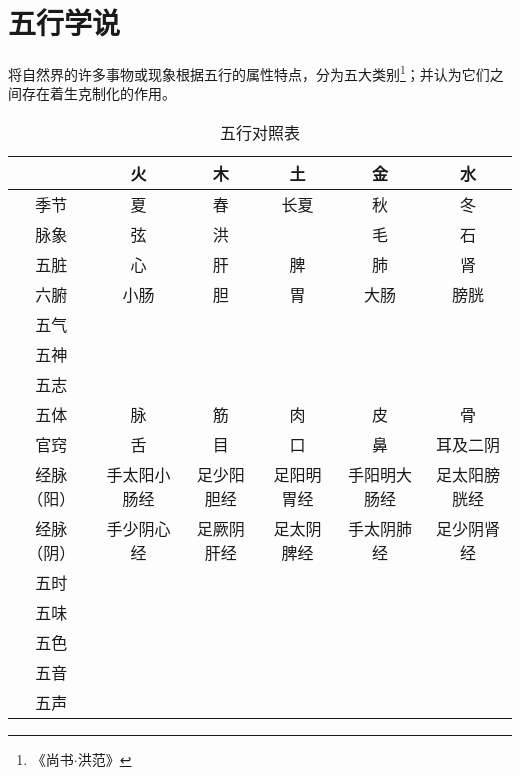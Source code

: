 
\section{五行学说}
将自然界的许多事物或现象根据五行的属性特点，分为五大类别\footnote{《尚书$\cdot$洪范》}；并认为它们之间存在着生克制化的作用。

\begin{table}[H]
  \centering
  \caption[]{五行对照表}
  \begin{tabular}{|c|c|c|c|c|c|}
    \hline & 火 & 木 & 土 & 金 & 水 \\
    \hline 季节 & 夏 & 春 & 长夏 & 秋 & 冬 \\
    \hline 脉象 & 弦 & 洪 & & 毛 & 石 \\
    \hline 五脏 & 心 & 肝 & 脾 & 肺 & 肾 \\
    \hline 六腑 & 小肠 & 胆 & 胃 & 大肠 & 膀胱 \\
    \hline 五气 & & & & & \\
    \hline 五神 & & & & & \\
    \hline 五志 & & & & & \\
    \hline 五体 & 脉 & 筋 & 肉 & 皮 & 骨 \\
    \hline 官窍 & 舌 & 目 & 口 & 鼻 & 耳及二阴 \\
    \hline 经脉（阳） & 手太阳小肠经 & 足少阳胆经 & 足阳明胃经 & 手阳明大肠经 & 足太阳膀胱经 \\
    \hline 经脉（阴） & 手少阴心经 & 足厥阴肝经 & 足太阴脾经 & 手太阴肺经 & 足少阴肾经 \\
    \hline 五时 & & & & & \\
    \hline 五味 & & & & & \\
    \hline 五色 & & & & & \\
    \hline 五音 & & & & & \\
    \hline 五声 & & & & & \\
    \hline
  \end{tabular}
\end{table}
